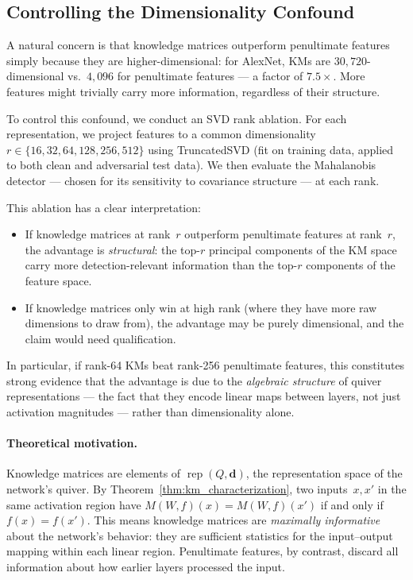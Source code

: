 \subsection{Controlling the Dimensionality Confound}
\label{sec:svd_ablation}

A natural concern is that knowledge matrices outperform penultimate features simply because they are higher-dimensional: for AlexNet, KMs are $30{,}720$-dimensional vs.\ $4{,}096$ for penultimate features --- a factor of $7.5\times$.
More features might trivially carry more information, regardless of their structure.

To control this confound, we conduct an SVD rank ablation.
For each representation, we project features to a common dimensionality $r \in \{16, 32, 64, 128, 256, 512\}$ using TruncatedSVD (fit on training data, applied to both clean and adversarial test data).
We then evaluate the Mahalanobis detector --- chosen for its sensitivity to covariance structure --- at each rank.

This ablation has a clear interpretation:
\begin{itemize}
    \item If knowledge matrices at rank~$r$ outperform penultimate features at rank~$r$, the advantage is \emph{structural}: the top-$r$ principal components of the KM space carry more detection-relevant information than the top-$r$ components of the feature space.

    \item If knowledge matrices only win at high rank (where they have more raw dimensions to draw from), the advantage may be purely dimensional, and the claim would need qualification.
\end{itemize}

In particular, if rank-64 KMs beat rank-256 penultimate features, this constitutes strong evidence that the advantage is due to the \emph{algebraic structure} of quiver representations --- the fact that they encode linear maps between layers, not just activation magnitudes --- rather than dimensionality alone.

\paragraph{Theoretical motivation.}
Knowledge matrices are elements of $\operatorname{rep}(Q, \mathbf{d})$, the representation space of the network's quiver.
By Theorem~\ref{thm:km_characterization}, two inputs~$x, x'$ in the same activation region have $M(W,f)(x) = M(W,f)(x')$ if and only if $f(x) = f(x')$.
This means knowledge matrices are \emph{maximally informative} about the network's behavior: they are sufficient statistics for the input--output mapping within each linear region.
Penultimate features, by contrast, discard all information about how earlier layers processed the input.


